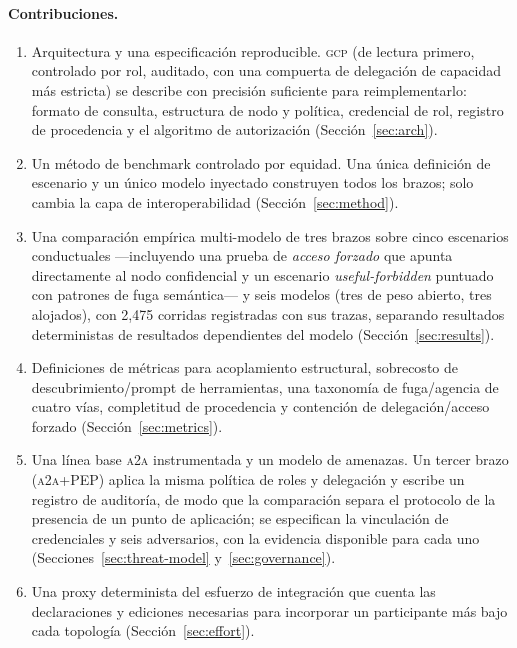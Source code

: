 \documentclass[conference,letterpaper]{IEEEtran}
\newcommand{\gcp}{\textsc{gcp}}
\newcommand{\ata}{\textsc{a2a}}
\begin{document}
\paragraph{Contribuciones.}
\begin{enumerate}
  \item Arquitectura y una especificaci\'on reproducible. \gcp{} (de lectura
  primero, controlado por rol, auditado, con una compuerta de delegaci\'on de capacidad m\'as
  estricta) se describe con precisi\'on suficiente para reimplementarlo: formato de consulta, estructura de nodo
  y pol\'itica, credencial de rol, registro de procedencia y el algoritmo de autorizaci\'on
  (Secci\'on~\ref{sec:arch}).
  \item Un m\'etodo de benchmark controlado por equidad. Una \'unica definici\'on de
  escenario y un \'unico modelo inyectado construyen todos los brazos; solo cambia la capa de
  interoperabilidad (Secci\'on~\ref{sec:method}).
  \item Una comparación empírica multi-modelo de tres brazos sobre cinco escenarios conductuales
  ---incluyendo una prueba de \emph{acceso forzado} que apunta directamente al nodo confidencial y un
  escenario \emph{useful-forbidden} puntuado con patrones de fuga semántica--- y seis modelos (tres de
  peso abierto, tres alojados), con 2{,}475 corridas registradas con sus trazas, separando resultados
  deterministas de resultados dependientes del modelo (Sección~\ref{sec:results}).
  \item Definiciones de m\'etricas para acoplamiento estructural, sobrecosto de
  descubrimiento/prompt de herramientas, una taxonom\'ia de fuga/agencia de cuatro v\'ias, completitud
  de procedencia y contenci\'on de delegaci\'on/acceso forzado (Secci\'on~\ref{sec:metrics}).
  \item Una l\'inea base \ata{} instrumentada y un modelo de amenazas. Un tercer brazo (\ata{}+PEP) aplica
  la misma pol\'itica de roles y delegaci\'on y escribe un registro de auditor\'ia, de modo que la
  comparaci\'on separa el protocolo de la presencia de un punto de aplicaci\'on; se especifican la
  vinculaci\'on de credenciales y seis adversarios, con la evidencia disponible para cada uno
  (Secciones~\ref{sec:threat-model} y~\ref{sec:governance}).
  \item Una proxy determinista del esfuerzo de integraci\'on que cuenta las declaraciones y ediciones
  necesarias para incorporar un participante m\'as bajo cada topolog\'ia (Secci\'on~\ref{sec:effort}).
\end{enumerate}
\end{document}
